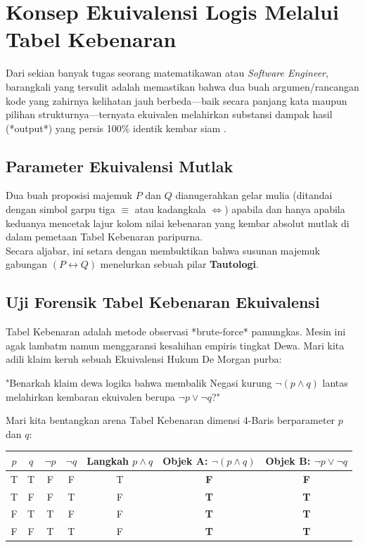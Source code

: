 \section{Konsep Ekuivalensi Logis Melalui Tabel Kebenaran}

Dari sekian banyak tugas seorang matematikawan atau \textit{Software Engineer}, barangkali yang tersulit adalah memastikan bahwa dua buah argumen/rancangan kode yang zahirnya kelihatan jauh berbeda—baik secara panjang kata maupun pilihan strukturnya—ternyata ekuivalen melahirkan substansi dampak hasil (*output*) yang persis 100\% identik kembar siam \cite{rosen2019}.

\subsection{Parameter Ekuivalensi Mutlak}

\begin{definisi}
Dua buah proposisi majemuk $P$ dan $Q$ dianugerahkan gelar mulia  (ditandai dengan simbol garpu tiga $\equiv$ atau kadangkala $\Leftrightarrow$) apabila dan hanya apabila keduanya mencetak lajur kolom nilai kebenaran yang kembar absolut mutlak di dalam pemetaan Tabel Kebenaran paripurna. \\
Secara aljabar, ini setara dengan membuktikan bahwa susunan majemuk gabungan $(P \leftrightarrow Q)$ menelurkan sebuah pilar \textbf{Tautologi}.
\end{definisi}

\subsection{Uji Forensik Tabel Kebenaran Ekuivalensi}

Tabel Kebenaran adalah metode observasi *brute-force* pamungkas. Mesin ini agak lambatm namun menggaransi kesahihan empiris tingkat Dewa. Mari kita adili klaim keruh sebuah Ekuivalensi Hukum De Morgan purba: 
\begin{center}
"Benarkah klaim dewa logika bahwa membalik Negasi kurung $\neg(p \wedge q)$ lantas melahirkan kembaran ekuivalen berupa $\neg p \vee \neg q$?"
\end{center}

Mari kita bentangkan arena Tabel Kebenaran dimensi 4-Baris berparameter $p$ dan $q$:

\begin{table}[h]
\centering
\begin{tabular}{|c|c||c|c||c|c||c|}
\hline
\textbf{$p$} & \textbf{$q$} & \textbf{$\neg p$} & \textbf{$\neg q$} & \textbf{Langkah $p \wedge q$} & \textbf{Objek A: $\neg(p \wedge q)$} & \textbf{Objek B: $\neg p \vee \neg q$} \\
\hline
T & T & F & F & T & \textbf{F} & \textbf{F} \\
T & F & F & T & F & \textbf{T} & \textbf{T} \\
F & T & T & F & F & \textbf{T} & \textbf{T} \\
F & F & T & T & F & \textbf{T} & \textbf{T} \\
\hline
\end{tabular}
\end{table}

